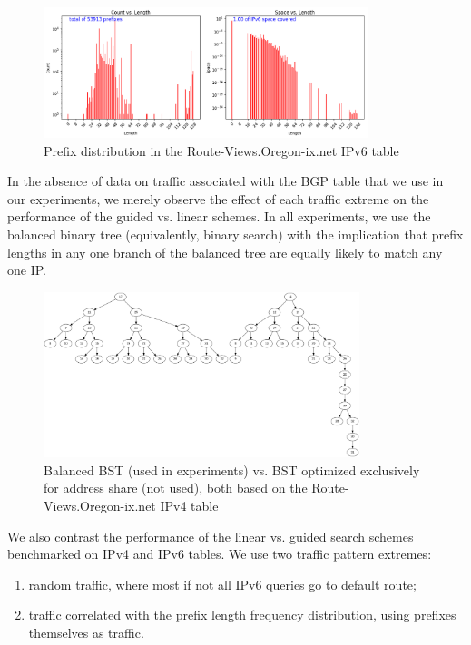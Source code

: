 \documentclass[conference,compsoc]{IEEEtran}
\begin{document}
\begin{figure}[h]
\centering
\includegraphics[height=1.5in]{../img/prefix_distribution_v6.png}
  \caption{Prefix distribution in the Route-Views.Oregon-ix.net IPv6 table}
\label{fig:prefixes-v6}
\end{figure}

In the absence of data on traffic associated with the BGP table that we
use in our experiments, we merely observe the effect of each traffic
extreme on the performance of the guided vs. linear schemes. In all
experiments, we use the balanced binary tree (equivalently, binary search)
with the implication that prefix lengths in any one branch of the
balanced tree are equally likely to match any one IP.

\begin{figure}[h]
\centering
\includegraphics[height=1.9in]{../img/trees_v4.png}
  \caption{Balanced BST (used in experiments) vs. BST optimized exclusively for address share (not used), both based on the Route-Views.Oregon-ix.net IPv4 table}
\label{fig:trees-v4}
\end{figure}

We also contrast the performance of the linear vs. guided search schemes
benchmarked on IPv4 and IPv6 tables. We use two traffic pattern extremes:

\begin{enumerate}
\item random traffic, where most if not all IPv6 queries go to default route;
\item traffic correlated with the prefix length frequency distribution,
  using prefixes themselves as traffic.
\end{enumerate}
\end{document}
